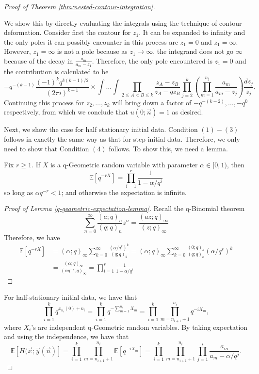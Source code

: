 \begin{proof}[Proof of Theorem \ref{thm:nested-contour-integration}]
\begin{enumerate}
We show this by directly evaluating the integrals using the technique of contour deformation. Consider first the contour for $z_1$. It can be expanded to infinity and the only poles it can possibly encounter in this process are $z_1 = 0$ and $z_1 = \infty$. However, $z_1 = \infty$ is not a pole because as $z_1 \rightarrow \infty$, the integrand does not go $\infty$ because of the decay in $\frac{a_m}{a_m - z_1}$. Therefore, the only pole encountered is $z_1 = 0$ and the contribution is calculated to be $$-q^{-(k-1)} \frac{(-1)^k q^{k(k-1)/2}}{(2 \pi i)^{k-1}} \times \int \dots \int \prod_{2 \le A < B \le k} \frac{z_A - z_B}{z_A - qz_B} \prod_{j=2}^k \left( \prod_{m=1}^{n_j} \frac{a_m}{a_m - z_j}\right) \frac{dz_j}{z_j}.$$ Continuing this process for $z_2, \dots, z_{k}$ will bring down a factor of $-q^{-(k-2)}, \dots, -q^{0}$ respectively, from which we conclude that $u(0;\vec{n}) = 1$ as desired.
\end{enumerate}

Next, we show the case for half stationary initial data. Condition $(1) - (3)$ follows in exactly the same way as that for step initial data. Therefore, we only need to show that Condition $(4)$ follows. To show this, we need a lemma. 

\begin{lemma}
\label{q-geometric-expectation-lemma}
Fix $r \ge 1$. If $X$ is a q-Geometric random variable with parameter $\alpha \in [0,1)$, then $$\mathbb{E}\left[ q^{-rX} \right] = \prod_{i=1}^{r} \frac{1}{1- \alpha / q^i}$$ so long as $\alpha q^{-r} < 1$; and otherwise the expectation is infinite.
\end{lemma}

\begin{proof}[Proof of Lemma \ref{q-geometric-expectation-lemma}]
Recall the q-Binomial theorem $$\sum_{n=0}^{\infty} \frac{(a;q)_n}{(q;q)_n} z^n = \frac{(az;q)_{\infty}}{(z;q)_{\infty}}$$
Therefore, we have 
\begin{align*}
\mathbb{E} \left[ q^{-rX} \right] &= (\alpha; q)_{\infty} \sum_{k=0}^{\infty} \frac{(\alpha / q^r)^k}{(q;q)_k} = (\alpha; q)_{\infty} \sum_{k=0}^{\infty} \frac{(0;q)_k}{(q;q)_k} (\alpha / q^r)^k\\
																	&= \frac{(\alpha; q)_{\infty} }{(\alpha q^{-r}; q)_{\infty}} = \prod_{i=1}^{r} \frac{1}{1- \alpha / q^i}
\end{align*}
\end{proof}
For half-stationary initial data, we have that $$\prod_{i=1}^{k} q^{x_{n_i}(0) + n_i} = \prod_{i=1}^{k} q^{-\sum_{m=1}^{n_i} X_m} = \prod_{i=1}^{k} \prod_{m=n_{i+1} +1}^{n_i} q^{-iX_m},$$ where $X_i$'s are independent q-Geometric random variables. By taking expectation and using the independence, we have that $$\mathbb{E} [H(\vec{x}; \vec{y}(\vec{n})] =  \prod_{i=1}^{k} \prod_{m=n_{i+1} +1}^{n_i} \mathbb{E}\left[ q^{-iX_m} \right] = \prod_{i=1}^{k} \prod_{m=n_{i+1} +1}^{n_i} \prod_{j=1}^{i} \frac{a_m}{a_m - \alpha / q^j}.$$


\end{proof}
